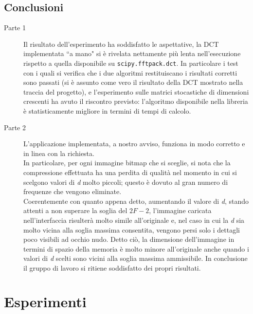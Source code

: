 \documentclass[preprint,12pt]{elsarticle}
\begin{document}
\newpage

\subsection*{Conclusioni}

\begin{description}
\item[Parte 1] Il risultato dell'esperimento ha soddisfatto le aspettative, la DCT implementata “a mano" si è rivelata nettamente più lenta nell'esecuzione rispetto a quella disponibile su \texttt{scipy.fftpack.dct}.
In particolare i test con i quali si verifica che i due algoritmi restituiscano i risultati corretti sono passati (si è assunto come vero il risultato della DCT mostrato nella traccia del progetto), e l'esperimento sulle matrici stocastiche di dimensioni crescenti ha avuto il riscontro previsto: l'algoritmo disponibile nella libreria è statisticamente migliore in termini di tempi di calcolo.
	
\item[Parte 2] L'applicazione implementata, a nostro avviso, funziona in modo corretto e in linea con la richiesta. \\In particolare, per ogni immagine bitmap che si sceglie, si nota che la compressione effettuata ha una perdita di qualità nel momento in cui si scelgono valori di \textit{d} molto piccoli; questo è dovuto al gran numero di frequenze che vengono eliminate.\\ Coerentemente con quanto appena detto, aumentando il valore di \textit{d}, stando attenti a non superare la soglia del $2F-2$, l'immagine caricata nell'interfaccia risulterà molto simile all'originale e, nel caso in cui la \textit{d} sia molto vicina alla soglia massima consentita, vengono persi solo i dettagli poco visibili ad occhio nudo. Detto ciò, la dimensione dell'immagine in termini di spazio della memoria è molto minore all'originale anche quando i valori di \textit{d} scelti sono vicini alla soglia massima ammissibile. In conclusione il gruppo di lavoro si ritiene soddisfatto dei propri risultati.
\end{description}

\newpage
\appendix

\section{Esperimenti}
\end{document}
